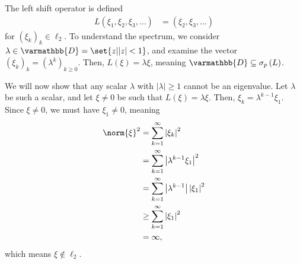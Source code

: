 \documentclass[10pt]{mypackage}
\renewcommand*{\mathbb}[1]{\varmathbb{#1}}
\begin{document}
\begin{example}
  The left shift operator is defined
  \begin{align*}
    L\left(\xi_1,\xi_2,\xi_3,\dots\right) &= \left(\xi_2,\xi_3,\dots\right)
  \end{align*}
  for $\left(\xi_k\right)_k\in \ell_2$. To understand the spectrum, we consider $\lambda \in \mathbb{D} = \set{z | |z| < 1}$, and examine the vector $\left(\xi_k\right)_k = \left(\lambda^{k}\right)_{k\geq 0}$. Then, $L\left(\xi\right) = \lambda \xi$, meaning $\mathbb{D} \subseteq \sigma_p\left(L\right)$.\newline

  We will now show that any scalar $\lambda$ with $\left\vert \lambda  \right\vert\geq 1$ cannot be an eigenvalue. Let $\lambda$ be such a scalar, and let $\xi \neq 0$ be such that $L\left(\xi\right) = \lambda \xi$. Then, $\xi_k = \lambda^{k-1}\xi_1$. Since $\xi \neq 0$, we must have $\xi_1 \neq 0$, meaning
  \begin{align*}
    \norm{\xi}^2 &= \sum_{k=1}^{\infty}\left\vert \xi_k \right\vert^2\\
                 &= \sum_{k=1}^{\infty}\left\vert \lambda^{k-1}\xi_1 \right\vert^2\\
                 &= \sum_{k=1}^{\infty}\left\vert \lambda^{k-1} \right\vert\left\vert \xi_1 \right\vert^2\\
                 &\geq \sum_{k=1}^{\infty}\left\vert \xi_1 \right\vert^2\\
                 &= \infty,
  \end{align*}
  which means $\xi \notin \ell_2$.\newline


\end{example}
\end{document}
